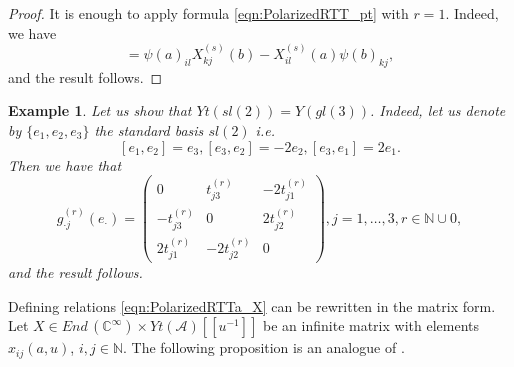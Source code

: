 \documentclass[10pt]{article}%
\numberwithin{equation}{section}
\newtheorem{rem}[thm]{Remark}
\newtheorem{example}[thm]{Example}
\begin{document}
\begin{proof}
It is enough to apply formula \eqref{eqn:PolarizedRTT_pt} with $r=1$. Indeed, we have
\begin{equation}
[X_{ij}^{(1)}(a),X_{kl}^{(s)}(b)]=\psi(a)_{il} X_{kj}^{(s)}(b)-X_{il}^{(s)}(a)\psi(b)_{kj},\label{eqn:Moduleaction}
\end{equation}
and the result follows.
\end{proof}
\begin{example}\label{ex:sl2}
Let us show that $Yt(sl(2))=Y(gl(3))$. Indeed, let us denote by $\{e_1,e_2,e_3\}$ the standard basis $sl(2)$ i.e.
\[
[e_1,e_2]=e_3, [e_3,e_2]=-2e_2, [e_3,e_1]=2e_1.
\]
Then we have that
\[
g_{\cdot j}^{(r)}(e_{\cdot})=\left(
\begin{array}{ccc}
0 & t_{j3}^{(r)} & -2t_{j1}^{(r)}\\
-t_{j3}^{(r)} & 0 & 2t_{j2}^{(r)}\\
2t_{j1}^{(r)} & -2t_{j2}^{(r)} & 0
\end{array}
\right),j=1,\ldots,3, r\in \mathbb{N}\cup{0},
\]
and the result follows.
\end{example}
Defining relations \eqref{eqn:PolarizedRTTa_X} can be rewritten in the matrix form. %
Let $X\in End\,(\mathbb{C}^{\infty})\times Yt(\mathcal{A})[[u^{-1}]]$ be an infinite matrix with elements $x_{ij}(a,u)$, $i,j\in\mathbb{N}$.
The following proposition is an analogue of  \cite[Proposition 1.2.2]{Molevbook}.
\end{document}

